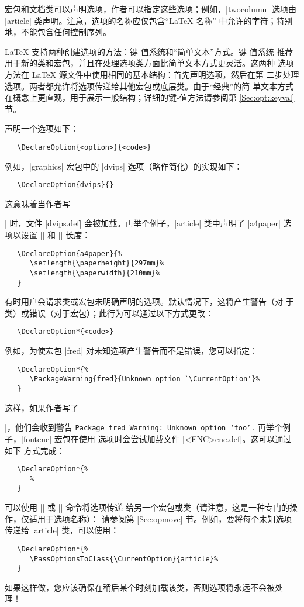 \documentclass{ltxguide}
\begin{document}
宏包和文档类可以声明选项，作者可以指定这些选项；例如，|twocolumn|
选项由 |article| 类声明。注意，选项的名称应仅包含“\LaTeX{} 名称”
中允许的字符；特别地，不能包含任何控制序列。

\LaTeX{} 支持两种创建选项的方法：键-值系统和“简单文本”方式。键-值系统
推荐用于新的类和宏包，并且在处理选项类方面比简单文本方式更灵活。这两种
选项方法在 \LaTeX{} 源文件中使用相同的基本结构：首先声明选项，然后在第
二步处理选项。两者都允许将选项传递给其他宏包或底层类。由于“经典”的简
单文本方式在概念上更直观，用于展示一般结构；详细的键-值方法请参阅第
\ref{Sec:opt:keyval} 节。

声明一个选项如下：
\begin{verbatim}
   \DeclareOption{<option>}{<code>}
\end{verbatim}
例如，|graphics| 宏包中的 |dvips| 选项（略作简化）的实现如下：
\begin{verbatim}
   \DeclareOption{dvips}{}
\end{verbatim}
这意味着当作者写 |\usepackage[dvips]{graphics}| 时，文件 |dvips.def|
会被加载。再举个例子，|article| 类中声明了 |a4paper| 选项以设置
|\paperheight| 和 |\paperwidth| 长度：
\begin{verbatim}
   \DeclareOption{a4paper}{%
      \setlength{\paperheight}{297mm}%
      \setlength{\paperwidth}{210mm}%
   }
\end{verbatim}
有时用户会请求类或宏包未明确声明的选项。默认情况下，这将产生警告（对
于类）或错误（对于宏包）；此行为可以通过以下方式更改：
\begin{verbatim}
   \DeclareOption*{<code>}
\end{verbatim}
例如，为使宏包 |fred| 对未知选项产生警告而不是错误，您可以指定：
\begin{verbatim}
   \DeclareOption*{%
      \PackageWarning{fred}{Unknown option `\CurrentOption'}%
   }
\end{verbatim}
这样，如果作者写了 |\usepackage[foo]{fred}|，他们会收到警告
\texttt{Package fred Warning: Unknown option `foo'.} 再举个例子，|fontenc|
宏包在使用  选项时会尝试加载文件 |<ENC>enc.def|。这可以通过如下
方式完成：
\begin{verbatim}
   \DeclareOption*{%
      %
   }
\end{verbatim}

可以使用 |\PassOptionsToPackage| 或 |\PassOptionsToClass| 命令将选项传递
给另一个宏包或类（请注意，这是一种专门的操作，仅适用于选项名称）：
请参阅第 \ref{Sec:opmove} 节。例如，要将每个未知选项传递给 |article|
类，可以使用：
\begin{verbatim}
   \DeclareOption*{%
      \PassOptionsToClass{\CurrentOption}{article}%
   }
\end{verbatim}
如果这样做，您应该确保在稍后某个时刻加载该类，否则选项将永远不会被处
理！
\end{document}
